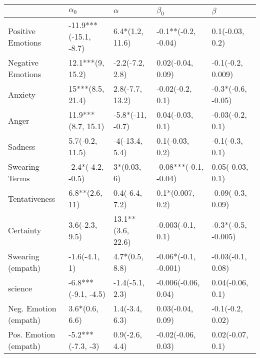 \begin{tabular}{lllll}
\toprule
{} &             $\alpha_0$ &           $\alpha$ &              $\beta_0$ &              $\beta$ \\
\midrule
Positive Emotions     &  -11.9***(-15.1, -8.7) &    6.4*(1.2, 11.6) &    -0.1**(-0.2, -0.04) &      0.1(-0.03, 0.2) \\
Negative Emotions     &       12.1***(9, 15.2) &    -2.2(-7.2, 2.8) &      0.02(-0.04, 0.09) &    -0.1(-0.2, 0.009) \\
Anxiety               &       15***(8.5, 21.4) &    2.8(-7.7, 13.2) &       -0.02(-0.2, 0.1) &   -0.3*(-0.6, -0.05) \\
Anger                 &     11.9***(8.7, 15.1) &   -5.8*(-11, -0.7) &       0.04(-0.03, 0.1) &     -0.03(-0.2, 0.1) \\
Sadness               &        5.7(-0.2, 11.5) &     -4(-13.4, 5.4) &        0.1(-0.03, 0.2) &      -0.1(-0.3, 0.1) \\
Swearing Terms        &      -2.4*(-4.2, -0.5) &        3*(0.03, 6) &  -0.08***(-0.1, -0.04) &     0.05(-0.03, 0.1) \\
Tentativeness         &         6.8**(2.6, 11) &     0.4(-6.4, 7.2) &       0.1*(0.007, 0.2) &    -0.09(-0.3, 0.09) \\
Certainty             &         3.6(-2.3, 9.5) &  13.1**(3.6, 22.6) &      -0.003(-0.1, 0.1) &  -0.3*(-0.5, -0.005) \\
Swearing (empath)     &          -1.6(-4.1, 1) &     4.7*(0.5, 8.8) &   -0.06*(-0.1, -0.001) &    -0.03(-0.1, 0.08) \\
science               &    -6.8***(-9.1, -4.5) &    -1.4(-5.1, 2.3) &    -0.006(-0.06, 0.04) &     0.04(-0.06, 0.1) \\
Neg. Emotion (empath) &         3.6*(0.6, 6.6) &     1.4(-3.4, 6.3) &      0.03(-0.04, 0.09) &     -0.1(-0.2, 0.02) \\
Pos. Emotion (empath) &      -5.2***(-7.3, -3) &     0.9(-2.6, 4.4) &     -0.02(-0.06, 0.03) &     0.02(-0.07, 0.1) \\
\bottomrule
\end{tabular}

